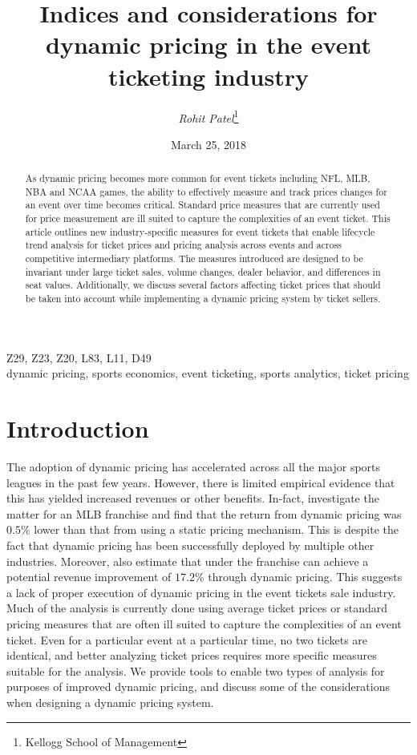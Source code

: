 \documentclass[letterpaper, 12pt]{article}
\begin{document}
\title{Indices and considerations for dynamic pricing in the event ticketing industry}
\author{\emph{Rohit Patel}\thanks{Kellogg School of Management}}
\date {March 25, 2018}
\maketitle
\begin{abstract} As dynamic pricing becomes more common for event tickets including NFL, MLB, NBA and NCAA games, the ability to effectively measure and track prices changes for an event over time becomes critical. Standard price measures that are currently used for price measurement are ill suited to capture the complexities of an event ticket. This article outlines new industry-specific measures for event tickets that enable lifecycle trend analysis for ticket prices and pricing analysis across events and across competitive intermediary platforms. The measures introduced are designed to be invariant under large ticket sales, volume changes, dealer behavior, and differences in seat values. Additionally, we discuss several factors affecting ticket prices that should be taken into account while implementing a dynamic pricing system by ticket sellers.
\end{abstract}
 Z29, Z23, Z20, L83, L11, D49 \\
 dynamic pricing, sports economics, event ticketing, sports analytics, ticket pricing

\section{Introduction}
The adoption of dynamic pricing has accelerated across all the major sports leagues in the past few years. However, there is limited empirical evidence that this has yielded increased revenues or other benefits.  In-fact, \cite{xu2017designing} investigate the matter for an MLB franchise and find that the return from dynamic pricing was $0.5\%$ lower than that from using a static pricing mechanism. This is despite the fact that dynamic pricing has been successfully deployed by multiple other industries. Moreover, \cite{xu2017designing} also estimate that under the franchise can achieve a potential revenue improvement of $17.2\%$ through dynamic pricing. This suggests a lack of proper execution of dynamic pricing in the event tickets sale industry. Much of the analysis is currently done using average ticket prices or standard pricing measures that are often ill suited to capture the complexities of an event ticket. Even for a particular event at a particular time, no two tickets are identical, and better analyzing ticket prices requires more specific measures suitable for the analysis. We provide tools to enable two types of analysis for purposes of improved dynamic pricing, and discuss some of the considerations when designing a dynamic pricing system. 
\end{document}
